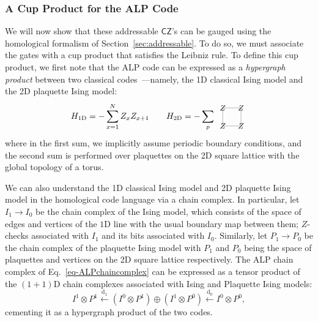 \documentclass[aps,prx,reprint,superscriptaddress,nofootinbib]{revtex4-2}
\theoremstyle{definition}
\newcommand{\exd}{\text{d}}
\newcommand{\<}{\langle}
\renewcommand{\>}{\rangle}
\begin{document}
\subsubsection{A Cup Product for the ALP Code}

We will now show that these addressable $\mathsf{CZ}$'s can be gauged using the homological formalism of Section~\ref{sec:addressable}.
%
To do so, we must associate the gates with a cup product that satisfies the Leibniz rule.
%
To define this cup product, we first note that the ALP code can be expressed as a \textit{hypergraph product} between two classical codes~\cite{Tillich_2014}---namely, the 1D classical Ising model and the 2D plaquette Ising model: 
\begin{equation}
    H_{\text{1D}} = -\sum_{x = 1}^{N} Z_{x} Z_{x + 1} \qquad H_{\text{2D}} = -\sum_{p}\,  \begin{tikzpicture}[scale = 0.5, baseline={([yshift=-.5ex]current bounding box.center)}]
    \draw[color = gray] (0, 0) -- (1.5, 0) -- (1.5, 1.5) -- (0, 1.5)--cycle;
    \node at (0,0) {\small $Z$};
    \node at (1.5,0) {\small $Z$};
    \node at (0,1.5) {\small $Z$};
    \node at (1.5,1.5) {\small $Z$};
    \end{tikzpicture}
\end{equation}
where in the first sum, we implicitly assume periodic boundary conditions, and the second sum is performed over plaquettes on the 2D square lattice with the global topology of a torus.

We can also understand the 1D classical Ising model and 2D plaquette Ising model in the homological code language via a chain complex.
%
In particular, let $I_1 \to I_0$ be the chain complex of the Ising model, which consists of the space of edges and vertices of the $1$D line with the usual boundary map between them;  $Z$-checks associated with $I_1$ and its bits associated with $I_0$.
%
Similarly, let $P_1 \to P_0$ be the chain complex of the plaquette Ising model with $P_1$ and $P_0$ being the space of plaquettes and vertices on the 2D square lattice respectively.
%
The ALP chain complex of Eq.~\eqref{eq-ALPchaincomplex} can be expressed as a tensor product of the $(1 + 1)$D chain complexes associated with Ising and Plaquette Ising models:
\begin{equation}
        I^1 \otimes P^1 \xleftarrow{\exd_{1} }(I^0 \otimes P^1) \oplus (I^1 \otimes P^0)\xleftarrow{\exd_{0}} I^0 \otimes P^0,
\end{equation}
cementing it as a hypergraph product of the two codes.
\end{document}
